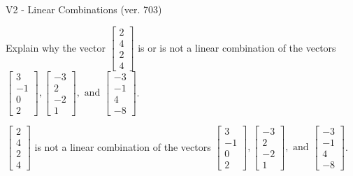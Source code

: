 \begin{exercise}
  \begin{exerciseTitle}V2 - Linear Combinations (ver. 703)\end{exerciseTitle}
  \begin{exerciseStatement}
    Explain why the vector \(\left[\begin{array}{c}
2 \\
4 \\
2 \\
4
\end{array}\right]\)  is or is not a linear 
	combination of the vectors \(\left[\begin{array}{c}
3 \\
-1 \\
0 \\
2
\end{array}\right] , \left[\begin{array}{c}
-3 \\
2 \\
-2 \\
1
\end{array}\right] , \text{ and } \left[\begin{array}{c}
-3 \\
-1 \\
4 \\
-8
\end{array}\right]\).
	


  \end{exerciseStatement}
  \begin{exerciseAnswer}
   \(\left[\begin{array}{c}
2 \\
4 \\
2 \\
4
\end{array}\right]\) 
  	 is not  
	a linear combination of the vectors \(\left[\begin{array}{c}
3 \\
-1 \\
0 \\
2
\end{array}\right] , \left[\begin{array}{c}
-3 \\
2 \\
-2 \\
1
\end{array}\right] , \text{ and } \left[\begin{array}{c}
-3 \\
-1 \\
4 \\
-8
\end{array}\right]\).

	
  


  \end{exerciseAnswer}
\end{exercise}